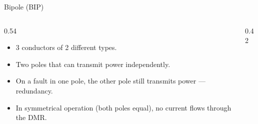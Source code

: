 \begin{frame}{Bipole (BIP)}
  \begin{columns}[c,onlytextwidth]
    \begin{column}{0.54\textwidth}
      \begin{itemize}
        \setlength{\itemsep}{0.4em}
        \item 3 conductors of 2 different types.
        \item Two poles that can transmit power independently.
        \item On a fault in one pole, the other pole still transmits power ---
              redundancy.
        \item In symmetrical operation (both poles equal), no current flows
              through the DMR.
      \end{itemize}
    \end{column}
    \begin{column}{0.42\textwidth}\centering
    \end{column}
  \end{columns}
\end{frame}

